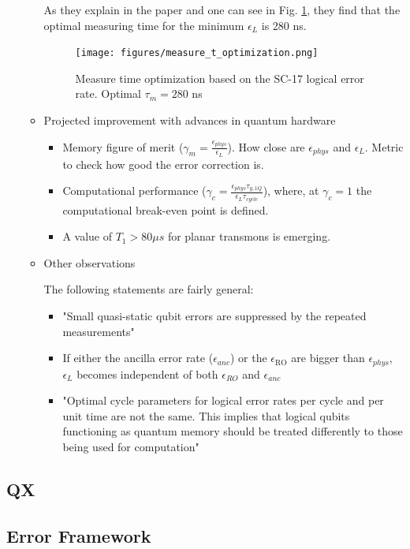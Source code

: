 \begin{itemize}
\begin{itemize}
As they explain in the paper and one can see in Fig. \ref{fig:orgcf82635}, they find that the optimal measuring time for the minimum \(\epsilon_L\) is 280 ns.

\begin{figure}[htbp]
\centering
\texttt{[image: figures/measure\_t\_optimization.png]}
\caption{\label{fig:orgcf82635}
Measure time optimization based on the SC-17 logical error rate. Optimal \(\tau_m = 280\) ns}
\end{figure}


\item Projected improvement with advances in quantum hardware
\label{sec:org61b2576}

\begin{itemize}
\item Memory figure of merit (\(\gamma_m = \frac{\epsilon_{phys}}{\epsilon_{L}}\)). How close are \(\epsilon_{phys}\) and \(\epsilon_{L}\). Metric to check how good the error correction is.

\item Computational performance (\(\gamma_c = \frac{\epsilon_{phys} \tau_{g,1Q}}{\epsilon_L \tau_{cycle}}\)), where, at \(\gamma_c = 1\) the computational break-even point is defined.

\item A value of \(T_1 > 80 \mu s\) for planar transmons is emerging.
\end{itemize}

\item Other observations
\label{sec:org71d98e6}

The following statements are fairly general:

\begin{itemize}
\item "Small quasi-static qubit errors are suppressed by the repeated measurements"
\item If either the ancilla error rate (\(\epsilon_{anc}\)) or the \(\epsilon_{\text{RO}}\) are bigger than \(\epsilon_{phys}\), \(\epsilon_L\) becomes independent of both \(\epsilon_{RO}\) and \(\epsilon_{anc}\)
\item "Optimal cycle parameters for logical error rates per cycle and per unit time are not the same. This implies that logical qubits functioning as quantum memory should be treated differently to those being used for computation"
\end{itemize}
\end{itemize}
\end{itemize}

\subsection*{QX}
\label{sec:orgb282506}
\subsection*{Error Framework}
\label{sec:org8dbf0a3}
